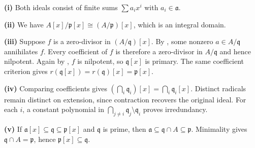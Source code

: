 \textbf{(i)} Both ideals consist of finite sums $\sum a_ix^i$ with $a_i\in\mathfrak{a}$.

\textbf{(ii)} We have $A[x]/\mathfrak{p}[x]\cong(A/\mathfrak{p})[x]$, which is an integral domain.

\textbf{(iii)} Suppose $f$ is a zero-divisor in $(A/\mathfrak{q})[x]$. By , some nonzero $a\in A/\mathfrak{q}$ annihilates $f$. Every coefficient of $f$ is therefore a zero-divisor in $A/\mathfrak{q}$ and hence nilpotent. Again by , $f$ is nilpotent, so $\mathfrak{q}[x]$ is primary. The same coefficient criterion gives $r(\mathfrak{q}[x])=r(\mathfrak{q})[x]=\mathfrak{p}[x]$.

\textbf{(iv)} Comparing coefficients gives $(\bigcap_i\mathfrak{q}_i)[x]=\bigcap_i\mathfrak{q}_i[x]$. Distinct radicals remain distinct on extension, since contraction recovers the original ideal. For each $i$, a constant polynomial in $\bigcap_{j\ne i}\mathfrak{q}_j\setminus\mathfrak{q}_i$ proves irredundancy.

\textbf{(v)} If $\mathfrak{a}[x]\subseteq\mathfrak{q}\subseteq\mathfrak{p}[x]$ and $\mathfrak{q}$ is prime, then $\mathfrak{a}\subseteq\mathfrak{q}\cap A\subseteq\mathfrak{p}$. Minimality gives $\mathfrak{q}\cap A=\mathfrak{p}$, hence $\mathfrak{p}[x]\subseteq\mathfrak{q}$.
